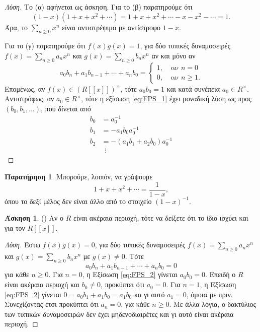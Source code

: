 \documentclass[12pt,a4paper,reqno]{amsart}
\theoremstyle{definition}
\newtheorem{exercise}{Άσκηση}
\newtheorem*{remark}{Παρατήρηση}
\begin{document}
\begin{proof}[Λύση]
  Το (α) αφήνεται ως άσκηση. Για το (β) παρατηρούμε ότι 
  \[
  (1-x)(1 + x + x^2 + \cdots) = 1 + x + x^2 + \cdots - x - x^2 - \cdots = 1.
  \]
  Άρα, το $\sum_{n\ge0}x^n$ είναι αντιστρέψιμο με αντίστροφο $1-x$.

  Για το (γ) παρατηρούμε ότι $f(x)g(x) = 1$, για δύο τυπικές δυναμοσειρές $f(x) = \sum_{n\ge0}a_nx^n$ και $g(x) = \sum_{n\ge0}b_nx^n$ αν και μόνο αν 
  \begin{equation}
    \label{eq:FPS_1}
    a_0b_n + a_1b_{n-1} + \cdots + a_nb_0 = 
    \begin{cases}
    1, &\ \text{αν $n=0$} \\
    0, &\ \text{αν $n \ge 1$}.
    \end{cases}
  \end{equation}
  Επομένως, αν $f(x) \in \left(
      R[\![x]\!]
    \right)^\times$, τότε $a_0b_0 = 1$ και κατά συνέπεια $a_0 \in R^\times$. Αντιστρόφως, αν $a_0 \in R^\times$, τότε η εξίσωση \eqref{eq:FPS_1} έχει μοναδική λύση ως προς $(b_0, b_1, \dots)$, που δίνεται από 
    \begin{align*}
      b_0 &= a_0^{-1} \\
      b_1 &= -a_1b_0a_0^{-1} \\
      b_2 &= -(a_1b_1 + a_2b_0)a_0^{-1} \\
      &\ \ \vdots
    \end{align*}
\end{proof}

\begin{remark}
  Μπορούμε, λοιπόν, να γράψουμε 
  \[
  1 + x + x^2 + \cdots = \frac{1}{1-x},
  \]
  όπου το δεξί μέλος δεν είναι άλλο από το στοιχείο $(1-x)^{-1}$. 
\end{remark}

\begin{exercise}{\rm(\cite[Άσκηση~7.2.4]{DF04})}
  \label{ex:DF_7.2.4_7.4.18}
  Αν ο $R$ είναι ακέραια περιοχή, τότε να δείξετε ότι το ίδιο ισχύει και για τον $R[\![x]\!]$.
\end{exercise}

\begin{proof}[Λύση]
  Έστω $f(x)g(x) = 0$, για δύο τυπικές δυναμοσειρές $f(x) = \sum_{n\ge0}a_nx^n$ και $g(x) = \sum_{n\ge0}b_nx^n$ με $g(x) \neq 0$. Τότε 
  \begin{equation}
    \label{eq:FPS_2}
    a_0b_n + a_1b_{n-1} + \cdots + a_nb_0 = 0
  \end{equation}
  για κάθε $n \ge 0$. Για $n=0$, η Εξίσωση \eqref{eq:FPS_2} γίνεται $a_0b_0 = 0$. Επειδή ο $R$ είναι ακέραια περιοχή και $b_0 \ne 0$, προκύπτει ότι $a_0=0$. Για $n=1$, η Εξίσωση \eqref{eq:FPS_2} γίνεται $0 = a_0b_1 + a_1b_0 = a_1b_0$ κα γι αυτό $a_1 = 0$, όμοια με πριν. Συνεχίζοντας έτσι προκύπτει ότι $a_n = 0$, για κάθε $n \ge 0$. Με άλλα λόγια, ο δακτύλιος των τυπικών δυναμοσειρών δεν έχει μηδενοδιαιρέτες και γι αυτό είναι ακέραια περιοχή.
\end{proof}
\end{document}
